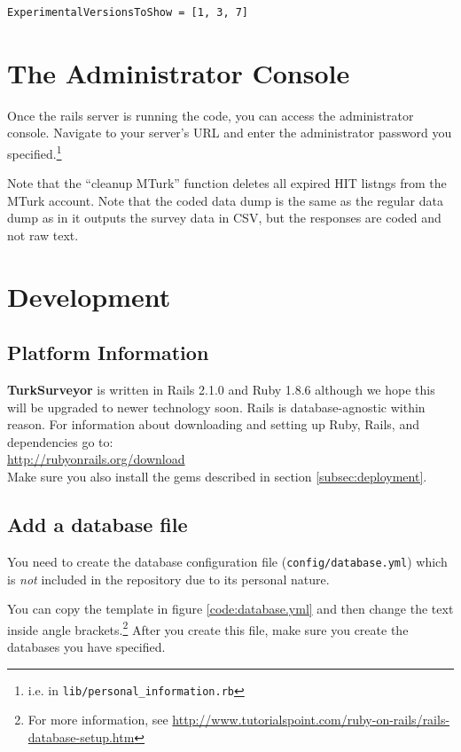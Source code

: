 \documentclass[12pt]{article}
\begin{document}
\begin{verbatim}
ExperimentalVersionsToShow = [1, 3, 7]
\end{verbatim}

\section{The Administrator Console}\label{sec:admin_console}

Once the rails server is running the code, you can access the administrator console. Navigate to your server's URL and enter the administrator password you specified.\footnote{i.e. in \texttt{lib/personal\_information.rb}}

Note that the ``cleanup MTurk'' function deletes all expired HIT listngs from the MTurk account. Note that the coded data dump is the same as the regular data dump as in it outputs the survey data in CSV, but the responses are coded and not raw text.

\section{Development}

\subsection{Platform Information}

\textbf{TurkSurveyor} is written in Rails 2.1.0 and Ruby 1.8.6 although we hope this will be upgraded to newer technology soon. Rails is database-agnostic within reason. For information about downloading and setting up Ruby, Rails, and dependencies go to:\\

\href{http://rubyonrails.org/download}{http://rubyonrails.org/download}\\

Make sure you also install the gems described in section \ref{subsec:deployment}.

\subsection{Add a database file}

You need to create the database configuration file (\texttt{config/database.yml}) which is \textit{not} included in the repository due to its personal nature.

You can copy the template in figure \ref{code:database.yml} and then change the text inside angle brackets.\footnote{For more information, see \href{http://www.tutorialspoint.com/ruby-on-rails/rails-database-setup.htm}{http://www.tutorialspoint.com/ruby-on-rails/rails-database-setup.htm}} After you create this file, make sure you create the databases you have specified.
\end{document}
